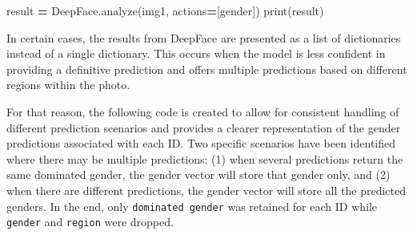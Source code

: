 \documentclass[11pt,]{article}
\newenvironment{Shaded}{\begin{snugshade}}{\end{snugshade}}
\newcommand{\BuiltInTok}[1]{#1}
\newcommand{\NormalTok}[1]{#1}
\newcommand{\OperatorTok}[1]{\textcolor[rgb]{0.81,0.36,0.00}{\textbf{#1}}}
\newcommand{\StringTok}[1]{\textcolor[rgb]{0.31,0.60,0.02}{#1}}
\begin{document}
\begin{Shaded}
\begin{Highlighting}[]
\NormalTok{result }\OperatorTok{=}\NormalTok{ DeepFace.analyze(img1, actions}\OperatorTok{=}\NormalTok{[}\StringTok{\textquotesingle{}gender\textquotesingle{}}\NormalTok{])}
\BuiltInTok{print}\NormalTok{(result)}
\end{Highlighting}
\end{Shaded}

In certain cases, the results from DeepFace are presented as a list of
dictionaries instead of a single dictionary. This occurs when the model
is less confident in providing a definitive prediction and offers
multiple predictions based on different regions within the photo.

For that reason, the following code is created to allow for consistent
handling of different prediction scenarios and provides a clearer
representation of the gender predictions associated with each ID. Two
specific scenarios have been identified where there may be multiple
predictions: (1) when several predictions return the same dominated
gender, the gender vector will store that gender only, and (2) when
there are different predictions, the gender vector will store all the
predicted genders. In the end, only \texttt{dominated\ gender} was
retained for each ID while \texttt{gender} and \texttt{region} were
dropped.
\end{document}
